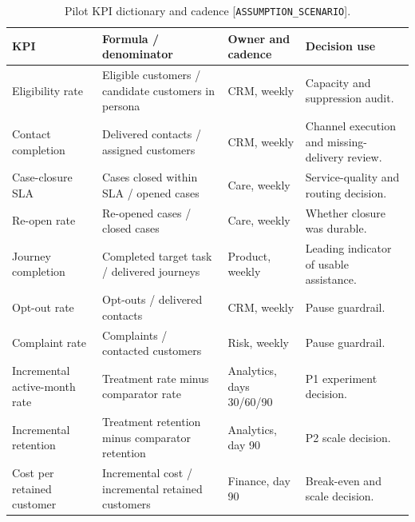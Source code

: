 \documentclass[a4paper,12pt]{article}
\newcommand{\scenario}{\texttt{ASSUMPTION\_SCENARIO}}
\begin{document}
\begin{table}[H]
\centering
\caption{Pilot KPI dictionary and cadence [\scenario].}
\label{tab:pilot-kpis}
\small
\begin{tabularx}{\textwidth}{P{0.24\textwidth}P{0.30\textwidth}P{0.15\textwidth}Y}
\toprule
\textbf{KPI} & \textbf{Formula / denominator} & \textbf{Owner and cadence} & \textbf{Decision use}\\
\midrule
Eligibility rate & Eligible customers / candidate customers in persona & CRM, weekly & Capacity and suppression audit.\\
Contact completion & Delivered contacts / assigned customers & CRM, weekly & Channel execution and missing-delivery review.\\
Case-closure SLA & Cases closed within SLA / opened cases & Care, weekly & Service-quality and routing decision.\\
Re-open rate & Re-opened cases / closed cases & Care, weekly & Whether closure was durable.\\
Journey completion & Completed target task / delivered journeys & Product, weekly & Leading indicator of usable assistance.\\
Opt-out rate & Opt-outs / delivered contacts & CRM, weekly & Pause guardrail.\\
Complaint rate & Complaints / contacted customers & Risk, weekly & Pause guardrail.\\
Incremental active-month rate & Treatment rate minus comparator rate & Analytics, days 30/60/90 & P1 experiment decision.\\
Incremental retention & Treatment retention minus comparator retention & Analytics, day 90 & P2 scale decision.\\
Cost per retained customer & Incremental cost / incremental retained customers & Finance, day 90 & Break-even and scale decision.\\
\bottomrule
\end{tabularx}
\end{table}
\end{document}
